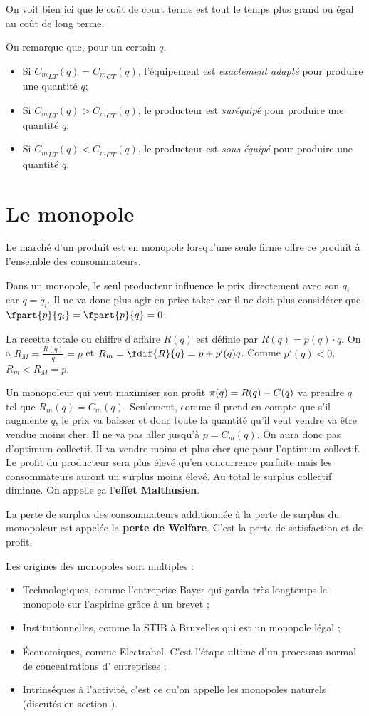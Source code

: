 On voit bien ici que
le coût de court terme est tout le temps plus grand ou égal
au coût de long terme.

On remarque que, pour un certain $q$,
\begin{itemize}
  \item Si ${C_m}_{LT}(q) = {C_m}_{CT}(q)$,
    l'équipement est \emph{exactement adapté} pour produire une quantité $q$;
  \item Si ${C_m}_{LT}(q) > {C_m}_{CT}(q)$,
    le producteur est \emph{suréquipé} pour produire une quantité $q$;
  \item Si ${C_m}_{LT}(q) < {C_m}_{CT}(q)$,
    le producteur est \emph{sous-équipé} pour produire une quantité $q$.
\end{itemize}

\section{Le monopole}
Le marché d'un produit est en monopole lorsqu'une seule firme
offre ce produit à l'ensemble des consommateurs.

Dans un monopole,
le seul producteur influence le prix directement avec son $q_i$ car $q = q_i$.
Il ne va donc plus agir en price taker car il ne doit plus
considérer que $\fpart{p}{q_i} = \fpart{p}{q} = 0$.

La recette totale ou chiffre d'affaire $R(q)$ est définie par
$R(q) = p(q) \cdot q$.
On a $R_M = \frac{R(q)}{q} = p$ et $R_m = \fdif{R}{q} = p + p'(q)q$.
Comme $p'(q) < 0$, $R_m < R_M = p$.

Un monopoleur qui veut maximiser son profit $\pi(q) = R(q) - C(q)$
va prendre $q$ tel que $R_m(q) = C_m(q)$.
Seulement, comme il prend en compte que s'il augmente $q$,
le prix va baisser et donc toute la quantité qu'il veut vendre va être vendue
moins cher.
Il ne va pas aller jusqu'à $p = C_m(q)$. On aura donc pas d'optimum collectif.
Il va vendre moins et plus cher que pour l'optimum collectif.
Le profit du producteur sera plus élevé qu'en concurrence parfaite mais
les consommateurs auront un surplus moins élevé.
Au total le surplus collectif diminue.
On appelle ça l'\textbf{effet Malthusien}.

La perte de surplus des consommateurs additionnée à la perte de surplus
du monopoleur est appelée la \textbf{perte de Welfare}.
C'est la perte de satisfaction et de profit.

Les origines des monopoles sont multiples :
\begin{itemize}
	\item Technologiques, comme l'entreprise Bayer
	qui garda très longtemps le monopole sur l'aspirine
	grâce à un brevet ;
	\item Institutionnelles, comme la STIB à Bruxelles qui
	est un monopole légal ;
	\item \'Economiques, comme Electrabel. C'est l'étape
	ultime d'un processus normal de concentrations d'
	entreprises ;
	\item Intrinséques à l'activité, c'est ce qu'on appelle
	les monopoles naturels (discutés en section ).
\end{itemize}

